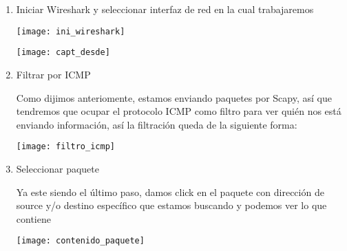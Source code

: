 \documentclass[spanish]{udpreport}
\begin{document}
\begin{enumerate}
	\item Iniciar Wireshark y seleccionar interfaz de red en la cual trabajaremos
    	\par \texttt{[image: ini\_wireshark]}
        
        \texttt{[image: capt\_desde]}
    \item Filtrar por ICMP
    	\par Como dijimos anteriomente, estamos enviando paquetes por Scapy, así que tendremos que ocupar el protocolo ICMP como filtro para ver quién nos está enviando información, así la filtración queda de la siguiente forma:
        \\[2ex]
        \par \texttt{[image: filtro\_icmp]}
        \newpage
    \item Seleccionar paquete
    	\par Ya este siendo el último paso, damos click en el paquete con dirección de source y/o destino específico que estamos buscando y podemos ver lo que contiene
        \par \texttt{[image: contenido\_paquete]}

\end{enumerate}
\end{document}
